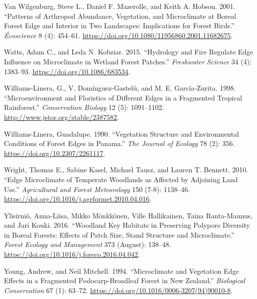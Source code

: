 \documentclass[
  12pt,
]{article}
\newlength{\cslhangindent}
\newenvironment{CSLReferences}[2] %
 {\begin{list}{}{%
  \setlength{\itemindent}{0pt}
  \setlength{\leftmargin}{0pt}
  \setlength{\parsep}{0pt}
  \ifodd #1
   \setlength{\leftmargin}{\cslhangindent}
   \setlength{\itemindent}{-1\cslhangindent}
  \fi
  \setlength{\itemsep}{#2\baselineskip}}}
 {\end{list}}
\begin{document}
\begin{CSLReferences}{1}{0}
Van Wilgenburg, Steve L., Daniel F. Mazerolle, and Keith A. Hobson.
2001. {``Patterns of Arthropod Abundance, Vegetation, and Microclimate
at Boreal Forest Edge and Interior in Two Landscapes: {Implications} for
Forest Birds.''} \emph{Écoscience} 8 (4): 454--61.
\url{https://doi.org/10.1080/11956860.2001.11682675}.

Watts, Adam C., and Leda N. Kobziar. 2015. {``Hydrology and Fire
Regulate Edge Influence on Microclimate in Wetland Forest Patches.''}
\emph{Freshwater Science} 34 (4): 1383--93.
\url{https://doi.org/10.1086/683534}.

Williams-Linera, G., V. Domínguez-Gastelú, and M. E. García-Zurita.
1998. {``Microenvironment and {Floristics} of {Different} {Edges} in a
{Fragmented} {Tropical} {Rainforest}.''} \emph{Conservation Biology} 12
(5): 1091--1102. \url{http://www.jstor.org/stable/2387582}.

Williams-Linera, Guadalupe. 1990. {``Vegetation {Structure} and
{Environmental} {Conditions} of {Forest} {Edges} in {Panama}.''}
\emph{The Journal of Ecology} 78 (2): 356.
\url{https://doi.org/10.2307/2261117}.

Wright, Thomas E., Sabine Kasel, Michael Tausz, and Lauren T. Bennett.
2010. {``Edge Microclimate of Temperate Woodlands as Affected by
Adjoining Land Use.''} \emph{Agricultural and Forest Meteorology} 150
(7-8): 1138--46. \url{https://doi.org/10.1016/j.agrformet.2010.04.016}.

Ylisirniö, Anna-Liisa, Mikko Mönkkönen, Ville Hallikainen, Taina
Ranta-Maunus, and Jari Kouki. 2016. {``Woodland Key Habitats in
Preserving Polypore Diversity in Boreal Forests: {Effects} of Patch
Size, Stand Structure and Microclimate.''} \emph{Forest Ecology and
Management} 373 (August): 138--48.
\url{https://doi.org/10.1016/j.foreco.2016.04.042}.

Young, Andrew, and Neil Mitchell. 1994. {``Microclimate and Vegetation
Edge Effects in a Fragmented Podocarp-Broadleaf Forest in {New}
{Zealand}.''} \emph{Biological Conservation} 67 (1): 63--72.
\url{https://doi.org/10.1016/0006-3207(94)90010-8}.

\end{CSLReferences}
\end{document}
